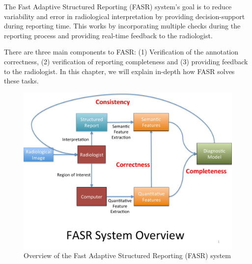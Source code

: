 The Fast Adaptive Structured Reporting (FASR) system's goal is to reduce variability and error in radiological interpretation by providing decision-support during reporting time. This works by incorporating multiple checks during the reporting process and providing real-time feedback to the radiologist.

There are three main components to FASR: (1) Verification of the annotation correctness, (2) verification of reporting completeness and (3) providing feedback to the radiologist. In this chapter, we will explain in-depth how FASR solves these tasks.

\begin{figure}[h]
\centering
\includegraphics[width=1\linewidth]{figures/fasr_diagram}
\caption{Overview of the Fast Adaptive Structured Reporting (FASR) system}
\label{fig:fasr_diagram}
\end{figure}